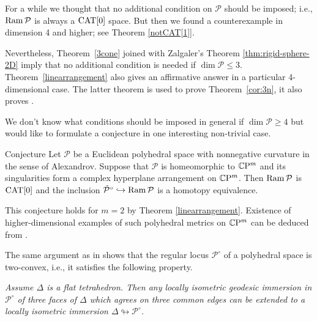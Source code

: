 \documentclass[oneside,a4paper]{article}
\def\Ram{\mathop{\rm Ram}\nolimits}
\begin{document}


For a while we thought that no additional condition on $\mathcal{P}$ should be imposed;
i.e., $\Ram \mathcal{P}$ is always a $\mathrm{CAT}[0]$ space.  
But then we found a counterexample in dimension 4 and higher;
see Theorem \ref{notCAT[1]}.

Nevertheless, Theorem~\ref{3cone} joined with Zalgaler's Theorem \ref{thm:rigid-sphere-2D}
imply that no additional condition is needed if $\dim \mathcal{P}\le 3$.
Theorem~\ref{linearrangement} also gives an affirmative answer in a particular 4-dimensional case.
The latter theorem is used to prove Theorem~\ref{cor:3n},
it also proves \cite[Conjecture 8.2]{panov}.

We don't know what conditions should be imposed in general if $\dim \mathcal{P}\ge 4$
but would like to formulate a conjecture in one interesting non-trivial case.

\begin{thm}{Conjecture} \label{planearrangement1} Let $\mathcal{P}$ be a Euclidean polyhedral space with nonnegative curvature in the sense of Alexandrov.
Suppose  that $\mathcal{P}$ is homeomorphic to $\mathbb{C}\mathrm{P}^m$ and its singularities form a complex hyperplane arrangement on $\mathbb{C}\mathrm{P}^m$. 
Then $\Ram \mathcal{P}$ is  $\mathrm{CAT}[0]$ 
and the inclusion $\tilde{\mathcal{P}}^\circ\hookrightarrow\Ram \mathcal{P}$ is a homotopy equivalence.
\end{thm}

This conjecture holds for $m=2$ by Theorem \ref{linearrangement}. 
Existence of higher-dimensional examples 
of such polyhedral metrics on $\mathbb{C}\mathrm{P}^m$ can be deduced from 
\cite{looijenga}.

The same argument as in \cite{panov-petrunin} shows that the regular locus $\mathcal{P}^\circ$ of a polyhedral space is two-convex,
i.e., it satisfies the following property.

\emph{Assume $\Delta$ is a flat tetrahedron.
Then any locally isometric geodesic immersion in  $\mathcal{P}^\circ$
of three faces of $\Delta$ which agrees on three common edges  can be extended to a
locally isometric immersion $\Delta\looparrowright \mathcal{P}^\circ$.}
\end{document}
